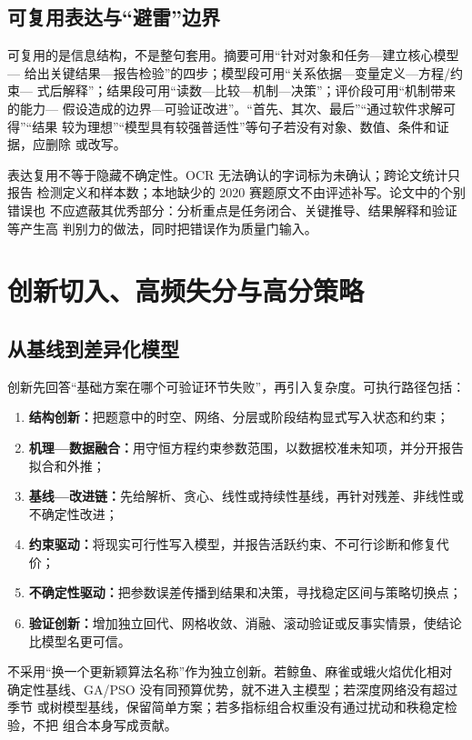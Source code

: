 \documentclass[UTF8,a4paper,12pt]{ctexart}
\begin{document}
{\subsection{可复用表达与“避雷”边界}

可复用的是信息结构，不是整句套用。摘要可用“针对对象和任务—建立核心模型—
给出关键结果—报告检验”的四步；模型段可用“关系依据—变量定义—方程/约束—
式后解释”；结果段可用“读数—比较—机制—决策”；评价段可用“机制带来的能力—
假设造成的边界—可验证改进”。“首先、其次、最后”“通过软件求解可得”“结果
较为理想”“模型具有较强普适性”等句子若没有对象、数值、条件和证据，应删除
或改写。

表达复用不等于隐藏不确定性。OCR 无法确认的字词标为未确认；跨论文统计只报告
检测定义和样本数；本地缺少的 2020 赛题原文不由评述补写。论文中的个别错误也
不应遮蔽其优秀部分：分析重点是任务闭合、关键推导、结果解释和验证等产生高
判别力的做法，同时把错误作为质量门输入。

\section{创新切入、高频失分与高分策略}

\subsection{从基线到差异化模型}

创新先回答“基础方案在哪个可验证环节失败”，再引入复杂度。可执行路径包括：
\begin{enumerate}
  \item \textbf{结构创新：}把题意中的时空、网络、分层或阶段结构显式写入状态和约束；
  \item \textbf{机理—数据融合：}用守恒方程约束参数范围，以数据校准未知项，并分开报告拟合和外推；
  \item \textbf{基线—改进链：}先给解析、贪心、线性或持续性基线，再针对残差、非线性或不确定性改进；
  \item \textbf{约束驱动：}将现实可行性写入模型，并报告活跃约束、不可行诊断和修复代价；
  \item \textbf{不确定性驱动：}把参数误差传播到结果和决策，寻找稳定区间与策略切换点；
  \item \textbf{验证创新：}增加独立回代、网格收敛、消融、滚动验证或反事实情景，使结论比模型名更可信。
\end{enumerate}

不采用“换一个更新颖算法名称”作为独立创新。若鲸鱼、麻雀或蛾火焰优化相对
确定性基线、GA/PSO 没有同预算优势，就不进入主模型；若深度网络没有超过季节
或树模型基线，保留简单方案；若多指标组合权重没有通过扰动和秩稳定检验，不把
组合本身写成贡献。

}
\end{document}
